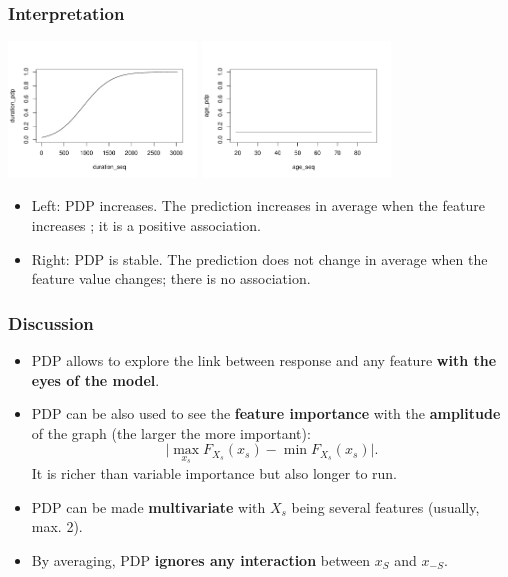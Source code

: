 \begin{frame}
\frametitle{Interpretation}
\begin{center}
\includegraphics[width=5cm]{../Graphs/PDP_Growing.pdf}
\includegraphics[width=5cm]{../Graphs/PDP_Stable.pdf}
\end{center}
\begin{itemize}
\item Left: PDP increases. The prediction increases in average when the feature increases ; it is a positive association.
\item Right: PDP is stable. The prediction does not change in average when the feature value changes; there is no association.
\end{itemize}
\end{frame}
\begin{frame}
\frametitle{Discussion}
\begin{itemize}
\item PDP allows to explore the link between response and any feature {\bf with the eyes of the model}.
\item PDP can be also used to see the {\bf feature importance} with the {\bf amplitude} of the graph (the larger the more important):
$$
\vert \max_{x_s} F_{X_s}(x_s) - \min F_{X_s}(x_s) \vert.
$$ 
It is richer than variable importance but also longer to run.
\item PDP can be made {\bf multivariate} with $X_s$ being several features (usually, max. 2).
\item By averaging, PDP {\bf ignores any interaction} between $x_S$ and $x_{-S}$.
\end{itemize}
\end{frame}
